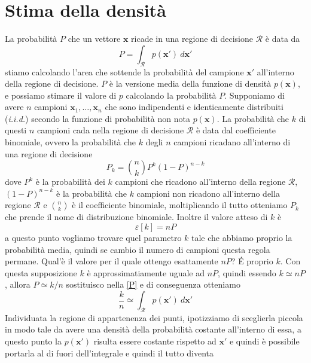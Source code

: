 \section{Stima della densità}
La probabilità $P$ che un vettore $\mathbf{x}$ ricade in una regione di decisione $\mathcal{R}$ è data da
\begin{equation}\label{P}
P = \int_{\mathcal{R}} p(\mathbf{x}') \ d\mathbf{x}'
\end{equation}
stiamo calcolando l'area che sottende la probabilità del campione $\mathbf{x}'$ all'interno della regione di decisione. $P$ è la versione media della funzione di densità $p(\mathbf{x})$, e possiamo stimare il valore di $p$ calcolando la probabilità $P$. Supponiamo di avere $n$ campioni $\mathbf{x}_1, \dots, \mathbf{x}_n$  che sono indipendenti e identicamente distribuiti (\emph{i.i.d.}) secondo la funzione di probabilità non nota $p(\mathbf{x})$. La probabilità che $k$ di questi $n$ campioni cada nella regione di decisione $\mathcal{R}$ è data dal coefficiente binomiale, ovvero la probabilità che $k$ degli $n$ campioni ricadano all'interno di una regione di decisione
\begin{equation}
P_k = \binom{n}{k} P^k (1-P)^{n-k}
\end{equation}
dove $P^k$ è la probabilità dei $k$ campioni che ricadono all'interno della regione $\mathcal{R}$, $(1-P)^{n-k}$ è la probabilità che $k$ campioni non ricadono all'interno della regione $\mathcal{R}$ e $\binom{n}{k}$ è il coefficiente binomiale, moltiplicando il tutto otteniamo $P_k$ che prende il nome di distribuzione binomiale. Inoltre il valore atteso di $k$ è
\begin{equation}
\varepsilon[k] = nP
\end{equation}
a questo punto vogliamo trovare quel parametro $k$ tale che abbiamo proprio la probabilità media, quindi se cambio il numero di campioni questa regola permane. Qual'è il valore per il quale ottengo esattamente $nP$? \'E proprio $k$. Con questa supposizione $k$ è approssimatiamente uguale ad $nP$, quindi essendo $k \simeq nP$, allora $P \simeq k/n$ sostituisco nella \ref{P} e di conseguenza otteniamo
\begin{equation}
\frac{k}{n} \simeq \int_{\mathcal{R}} p(\mathbf{x}') \ d\mathbf{x}'
\end{equation}
Individuata la regione di appartenenza dei punti, ipotizziamo di sceglierla piccola in modo tale da avere una densità della probabilità costante all'interno di essa, a questo punto la $p(\mathbf{x}')$ risulta essere costante rispetto ad $\mathbf{x}'$ e quindi è possibile portarla al di fuori dell'integrale e quindi il tutto diventa
